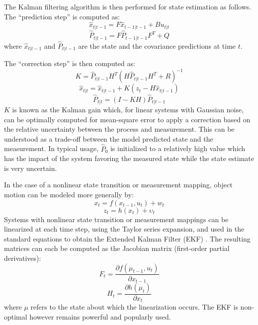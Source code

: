 \documentclass[a4paper,twoside,12pt]{report}
\begin{document}
The Kalman filtering algorithm is then performed for state estimation as follows. The ``prediction step'' is computed as:
\begin{equation}
\hat{x}_{t|t-1}=F\hat{x}_{t-1|t-1}+Bu_{t|t}
\end{equation}
\begin{equation}
\hat{P}_{t|t-1}=F\hat{P}_{t-1|t-1}F^T+Q 
\end{equation}
where $\hat{x}_{t|t-1}$ and $\hat{P}_{t|t-1}$ are the state and the covariance predictions at  time $t$. 

The ``correction step'' is then computed as:
\begin{equation} 
K = \hat{P}_{t|t-1}H^T(H\hat{P}_{t|t-1}H^T+R)^{-1}
\end{equation}
\begin{equation} 
\hat{x}_{t|t} = \hat{x}_{t|t-1}+K(z_t-H\hat{x}_{t|t-1})
\end{equation}
\begin{equation} 
\hat{P}_{t|t}=(I-KH)\hat{P}_{t|t-1}
\end{equation}
$K$ is known as the Kalman gain which, for linear systems with Gaussian noise, can be optimally computed for mean-square error to apply a correction based on the relative uncertainty between the process and measurement. This can be understood as a trade-off between the model predicted state and the measurement. In typical usage, $\hat{P}_0$ is initialized to a relatively high value which has the impact of the system favoring the measured state while the state estimate is very uncertain.

In the case of a nonlinear state transition or measurement mapping, object motion can be modeled more generally by:
\begin{equation} 
x_t=f(x_{t-1},u_{t})+w_{t}
\end{equation}
\begin{equation} 
z_t=h(x_{t})+{\upsilon}_t
\end{equation}
Systems with nonlinear state transition or measurement mappings can be linearized at each time step, using the Taylor series expansion, and used in the standard equations to obtain the Extended Kalman Filter (EKF) \citep{trackbook}. The resulting matrices can each be computed as the Jacobian matrix (first-order partial derivatives):
\begin{equation}
F_t = \frac{\partial f(\mu_{t-1}, u_{t})}{\partial x_{t-1}}
\end{equation}
\begin{equation} 
H_t = \frac{\partial h(\mu_{t})}{\partial x_t} 
\end{equation}
where $\mu$ refers to the state about which the linearization occurs. The EKF is non-optimal however remains powerful and popularly used.
\end{document}

